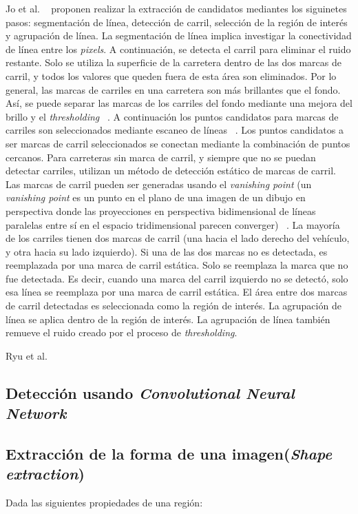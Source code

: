 Jo et al. ~ proponen realizar la extracción de candidatos mediantes los siguinetes pasos: segmentación
de línea, detección de carril, selección de la región de interés y agrupación de línea. La segmentación de línea implica investigar la conectividad de línea entre los \emph{pixels}.
A continuación, se detecta el carril para eliminar el ruido restante. Solo se utiliza la superficie de la carretera dentro de las dos marcas de 
carril, y todos los valores que queden fuera de esta área son eliminados. Por lo general, las marcas de carriles en una carretera son más brillantes que el fondo.
Así, se puede separar las marcas de los carriles del fondo mediante una  mejora del brillo y el \emph{thresholding} ~. A continuación los 
puntos candidatos para marcas de carriles son seleccionados mediante escaneo de líneas ~. Los puntos candidatos a ser marcas de carril 
seleccionados se conectan mediante la combinación de puntos cercanos. Para carreteras sin marca de carril, y siempre que no se puedan detectar carriles, utilizan 
un método de detección estático de marcas de carril. Las marcas de carril pueden ser generadas usando el \emph{vanishing point} (un \emph{vanishing point} es un punto 
en el plano de una imagen de un dibujo en perspectiva donde las proyecciones en perspectiva bidimensional de líneas paralelas entre sí en el espacio 
tridimensional parecen converger) ~. La mayoría de los carriles tienen dos marcas de carril (una hacia el lado derecho 
del vehículo, y otra hacia su lado izquierdo). Si una de las dos marcas no es detectada, es reemplazada por una marca de carril estática. Solo 
se reemplaza la marca que no fue detectada. Es decir, cuando una marca del carril izquierdo no se detectó, solo esa línea se reemplaza por una marca 
de carril estática. El área entre dos marcas de carril detectadas es seleccionada como la región de interés. La agrupación 
de línea se aplica dentro de la región de interés. La agrupación de línea también remueve el ruido creado por el proceso de \emph{thresholding}.

Ryu et al. ~ 

\subsection{Detección usando \emph{Convolutional Neural Network}}

	\subsection{Extracción de la forma de una imagen(\emph{Shape extraction})}
	Dada las siguientes propiedades de una región:\\

